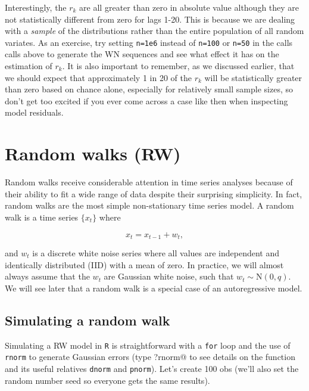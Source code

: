 Interestingly, the $r_k$ are all greater than zero in absolute value although they are not statistically different from zero for lags 1-20.  This is because we are dealing with a \emph{sample} of the distributions rather than the entire population of all random variates.  As an exercise, try setting \texttt{n=1e6} instead of \texttt{n=100} or \texttt{n=50} in the calls calls above to generate the WN sequences and see what effect it has on the estimation of $r_k$.  It is also important to remember, as we discussed earlier, that we should expect that approximately 1 in 20 of the $r_k$ will be statistically greater than zero based on chance alone, especially for relatively small sample sizes, so don't get too excited if you ever come across a case like then when inspecting model residuals.


\section{Random walks (RW)}

Random walks receive considerable attention in time series analyses because of their ability to fit a wide range of data despite their surprising simplicity.  In fact, random walks are the most simple non-stationary time series model.  A random walk is a time series $\{x_t\}$ where

\begin{equation}\label{eqn:defnRW2}
  x_t = x_{t-1} + w_t,
\end{equation}

\noindent and $w_t$ is a discrete white noise series where all values are independent and identically distributed (IID) with a mean of zero. In practice, we will almost always assume that the $w_t$ are Gaussian white noise, such that $w_t \sim \text{N}(0,q)$.  We will see later that a random walk is a special case of an autoregressive model.

\subsection{Simulating a random walk}

Simulating a RW model in \texttt{R} is straightforward with a \texttt{for} loop and the use of \texttt{rnorm} to generate Gaussian errors (type \verb@?rnorm@ to see details on the function and its useful relatives \texttt{dnorm} and \texttt{pnorm}).  Let's create 100 obs (we'll also set the random number seed so everyone gets the same results).  

